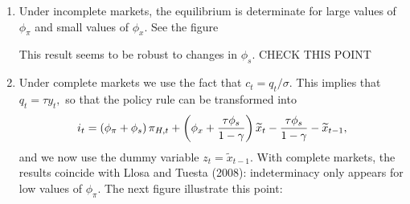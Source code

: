 \documentclass{article}
\begin{document}
\begin{enumerate}
\item Under incomplete markets, the equilibrium is determinate for large
values of $\phi _{\pi }$ and small values of $\phi _{x}.$ See the figure%

This result seems to be robust to changes in $\phi _{s}.$ CHECK THIS POINT

\item Under complete markets we use the fact that $c_{t}=q_{t}/\sigma .$
This implies that $q_{t}=\tau y_{t},$ so that the policy rule can be
transformed into%
\begin{equation*}
i_{t}=\left( \phi _{\pi }+\phi _{s}\right) \pi _{H,t}+\left( \phi _{x}+\frac{%
\tau \phi _{s}}{1-\gamma }\right) \widetilde{x}_{t}-\frac{\tau \phi _{s}}{%
1-\gamma }-\widetilde{x}_{t-1},
\end{equation*}%
and we now use the dummy variable $z_{t}=\widetilde{x}_{t-1}.$ With complete
markets, the results coincide with Llosa and Tuesta (2008): indeterminacy
only appears for low values of $\phi _{\pi }.$ The next figure illustrate
this point:%


\end{enumerate}
\end{document}
